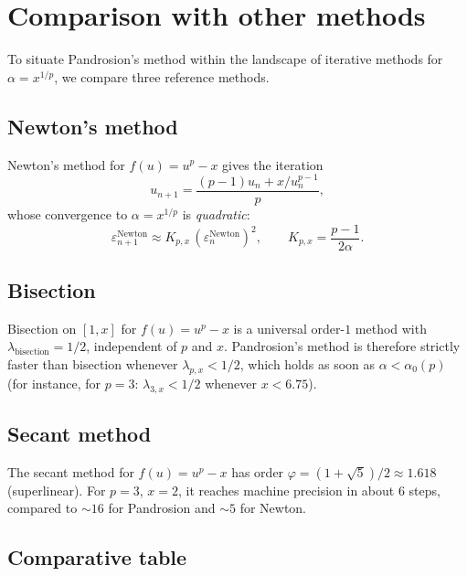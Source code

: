 \documentclass[10pt,a4paper,oneside]{book}
\theoremstyle{definition}
\theoremstyle{remark}
\newcommand{\eps}{\varepsilon}
\begin{document}
\section{Comparison with other methods}
\label{sec:comparaisons}

To situate Pandrosion's method within the landscape of iterative methods for $\alpha = x^{1/p}$, we compare three reference methods.

\subsection{Newton's method}

Newton's method for $f(u) = u^p - x$ gives the iteration
\[
  u_{n+1} = \frac{(p-1)u_n + x/u_n^{p-1}}{p},
\]
whose convergence to $\alpha = x^{1/p}$ is \emph{quadratic}:
\[
  \eps_{n+1}^{\text{Newton}} \approx K_{p,x}\,(\eps_n^{\text{Newton}})^2, \qquad K_{p,x} = \frac{p-1}{2\alpha}.
\]

\subsection{Bisection}

Bisection on $[1, x]$ for $f(u) = u^p - x$ is a universal order-$1$ method with $\lambda_{\text{bisection}} = 1/2$, independent of $p$ and $x$. Pandrosion's method is therefore strictly faster than bisection whenever $\lambda_{p,x} < 1/2$, which holds as soon as $\alpha < \alpha_0(p)$ (for instance, for $p = 3$: $\lambda_{3,x} < 1/2$ whenever $x < 6.75$).

\subsection{Secant method}

The secant method for $f(u) = u^p - x$ has order $\varphi = (1+\sqrt{5})/2 \approx 1.618$ (superlinear). For $p = 3$, $x = 2$, it reaches machine precision in about $6$ steps, compared to $\sim 16$ for Pandrosion and $\sim 5$ for Newton.

\subsection{Comparative table}
\end{document}
